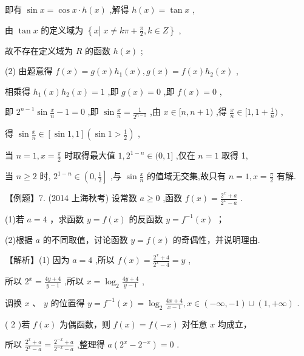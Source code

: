 \documentclass[10pt]{article}
\begin{document}
即有 \(\sin x = \cos x \cdot  h\left( x\right)\) ,解得 \(h\left( x\right)  = \tan x\) ,

由 \(\tan x\) 的定义域为 \(\left\{  {x\left| {\;x \neq  {k\pi } + \frac{\pi }{2}}\right. ,k \in  Z}\right\}\) ,

故不存在定义域为 \(R\) 的函数 \(h\left( x\right)\) ;

(2) 由题意得 \(f\left( x\right)  = g\left( x\right) {h}_{1}\left( x\right) ,g\left( x\right)  = f\left( x\right) {h}_{2}\left( x\right)\) ,

相乘得 \({h}_{1}\left( x\right) {h}_{2}\left( x\right)  = 1\) ,即 \(g\left( x\right)  = 0\) ,即 \(f\left( x\right)  = 0\) ,

即 \({2}^{n - 1}\sin \frac{x}{n} - 1 = 0\) ,即 \(\sin \frac{x}{n} = \frac{1}{{2}^{n - 1}}\) ,由 \(x \in  \lbrack n,n + 1)\) ,得 \(\frac{x}{n} \in  \lbrack 1,1 + \frac{1}{n})\) ,

得 \(\sin \frac{x}{n} \in  \left\lbrack  {\sin 1,1}\right\rbrack  \left( {\sin 1 > \frac{1}{2}}\right)\) ,

当 \(n = 1,x = \frac{\pi }{2}\) 时取得最大值 \(1,{2}^{1 - n} \in  (0,1\rbrack\) ,仅在 \(n = 1\) 取得 1,

当 \(n \geq  2\) 时, \({2}^{1 - n} \in  \left( {0,\frac{1}{2}}\right\rbrack\) ,与 \(\sin \frac{x}{n}\) 的值域无交集,故只有 \(n = 1,x = \frac{\pi }{2}\) 有解.

【例题】7. (2014 上海秋考) 设常数 \(a \geq  0\) ,函数 \(f\left( x\right)  = \frac{{2}^{x} + a}{{2}^{x} - a}\) .

(1)若 \(a = 4\) ，求函数 \(y = f\left( x\right)\) 的反函数 \(y = {f}^{-1}\left( x\right)\) ；

(2)根据 \(a\) 的不同取值，讨论函数 \(y = f\left( x\right)\) 的奇偶性，并说明理由.

【解析】(1) 因为 \(a = 4\) ,所以 \(f\left( x\right)  = \frac{{2}^{x} + 4}{{2}^{x} - 4} = y\) ,

所以 \({2}^{x} = \frac{{4y} + 4}{y - 1}\) ,所以 \(x = {\log }_{2}\frac{{4y} + 4}{y - 1}\) ,

调换 \(x\text{ 、 }y\) 的位置得 \(y = {f}^{-1}\left( x\right)  = {\log }_{2}\frac{{4x} + 4}{x - 1},x \in  \left( {-\infty , - 1}\right)  \cup  \left( {1, + \infty }\right)\) .

( 2 )若 \(f\left( x\right)\) 为偶函数，则 \(f\left( x\right)  = f\left( {-x}\right)\) 对任意 \(x\) 均成立，

所以 \(\frac{{2}^{x} + a}{{2}^{x} - a} = \frac{{2}^{-x} + a}{{2}^{-x} - a}\) ,整理得 \(a\left( {{2}^{x} - {2}^{-x}}\right)  = 0\) .
\end{document}
